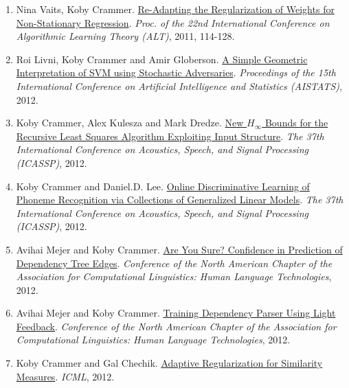 \documentclass{resume}
\begin{document}
\begin{enumerate}
\item Nina Vaits, Koby Crammer.
\href{http://webee.technion.ac.il/people/koby/publications/ada_arow_alt2011.pdf}{Re-Adapting the Regularization of Weights for Non-Stationary
  Regression}.
{\em Proc. of the 22nd International Conference on Algorithmic Learning Theory
(ALT)}, 2011, 114-128.

\item Roi Livni, {Koby Crammer} and Amir Globerson.
\href{http://webee.technion.ac.il/people/koby/publications/229_paper.pdf}{A Simple Geometric Interpretation of SVM using Stochastic Adversaries}.
{\em Proceedings of the 15th International Conference on Artificial Intelligence and Statistics (AISTATS)}, 2012.

\item {Koby Crammer}, Alex Kulesza and Mark Dredze.
\href{http://webee.technion.ac.il/people/koby/publications/icassp12_rls.pdf}{New
  $H_\infty$ Bounds for the Recursive Least Squares Algorithm Exploiting Input Structure}.
{\em The 37th International Conference on Acoustics, Speech, and Signal Processing (ICASSP)}, 2012.
 

\item {Koby Crammer} and Daniel.D. Lee.
\href{http://webee.technion.ac.il/people/koby/publications/icassp12_nherd.pdf}{Online
  Discriminative Learning of Phoneme Recognition via Collections of Generalized Linear Models}.
{\em The 37th International Conference on Acoustics, Speech, and Signal Processing (ICASSP)}, 2012.
 
\item Avihai Mejer and {Koby Crammer}.
\href{http://webee.technion.ac.il/people/koby/publications/conf_parsing_naacl12.pdf}{Are You Sure? Confidence in Prediction of Dependency
          Tree Edges}.
{\em Conference of the North American Chapter of the Association for
  Computational Linguistics: Human Language Technologies}, 2012.

 
\item Avihai Mejer and {Koby Crammer}.
\href{http://webee.technion.ac.il/people/koby/publications/light_naacl12.pdf}{Training Dependency Parser Using Light Feedback}.
{\em Conference of the North American Chapter of the Association for
  Computational Linguistics: Human Language Technologies}, 2012.


\item 
 {Koby Crammer} and Gal Chechik.
\href{http://webee.technion.ac.il/people/koby/publications/icml12_aroma.pdf}{Adaptive Regularization for Similarity Measures}.
{\em ICML}, 2012.



\end{enumerate}
\end{document}
